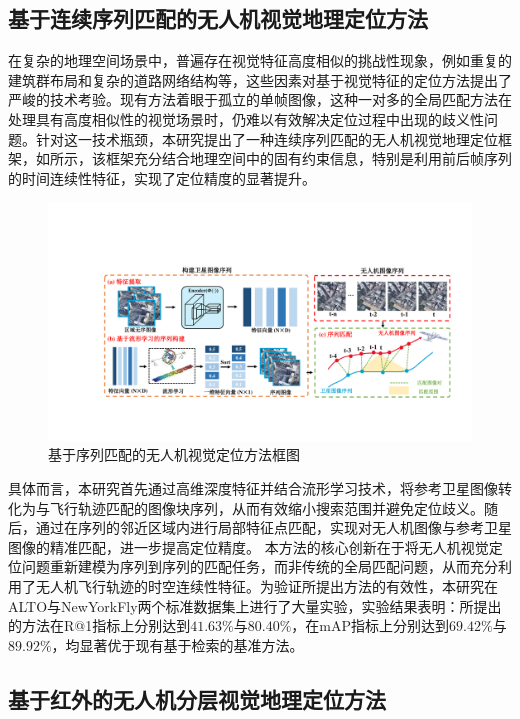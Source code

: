 \documentclass[12pt]{article}
\begin{document}
\subsection{基于连续序列匹配的无人机视觉地理定位方法}


在复杂的地理空间场景中，普遍存在视觉特征高度相似的挑战性现象，例如重复的建筑群布局和复杂的道路网络结构等，这些因素对基于视觉特征的定位方法提出了严峻的技术考验。现有方法着眼于孤立的单帧图像，这种一对多的全局匹配方法在处理具有高度相似性的视觉场景时，仍难以有效解决定位过程中出现的歧义性问题。针对这一技术瓶颈，本研究提出了一种连续序列匹配的无人机视觉地理定位框架，如所示，该框架充分结合地理空间中的固有约束信息，特别是利用前后帧序列的时间连续性特征，实现了定位精度的显著提升。

\begin{figure}[H]
	\centering
	\includegraphics[width=1.0\textwidth]{figures/existingwork/基于序列匹配的无人机视觉定位方法框图.pdf}
	\caption{基于序列匹配的无人机视觉定位方法框图} 
 \label{seqoverall}
\end{figure}

具体而言，本研究首先通过高维深度特征并结合流形学习技术，将参考卫星图像转化为与飞行轨迹匹配的图像块序列，从而有效缩小搜索范围并避免定位歧义。随后，通过在序列的邻近区域内进行局部特征点匹配，实现对无人机图像与参考卫星图像的精准匹配，进一步提高定位精度。
本方法的核心创新在于将无人机视觉定位问题重新建模为序列到序列的匹配任务，而非传统的全局匹配问题，从而充分利用了无人机飞行轨迹的时空连续性特征。为验证所提出方法的有效性，本研究在ALTO与NewYorkFly两个标准数据集上进行了大量实验，实验结果表明：所提出的方法在R@1指标上分别达到$41.63\%$与$80.40\%$，在mAP指标上分别达到$69.42\%$与$89.92\%$，均显著优于现有基于检索的基准方法。




\subsection{基于红外的无人机分层视觉地理定位方法}
\end{document}
